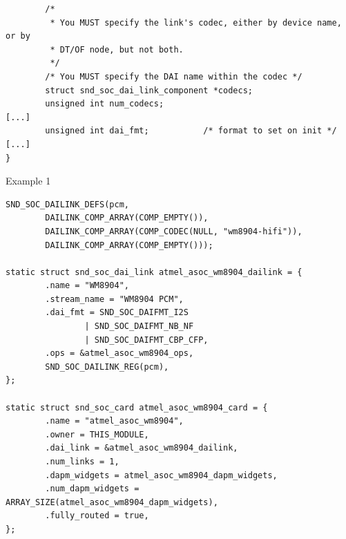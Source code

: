 \begin{frame}[fragile]{}
  \begin{block}{}
    \fontsize{10}{10}\selectfont
    \begin{verbatim}
        /*
         * You MUST specify the link's codec, either by device name, or by
         * DT/OF node, but not both.
         */
        /* You MUST specify the DAI name within the codec */
        struct snd_soc_dai_link_component *codecs;
        unsigned int num_codecs;
[...]
        unsigned int dai_fmt;           /* format to set on init */
[...]
}
    \end{verbatim}
  \end{block}
\end{frame}

\begin{frame}[fragile]{Example 1}
  \begin{block}{}
    \fontsize{8}{8}\selectfont
    \begin{verbatim}
SND_SOC_DAILINK_DEFS(pcm,
        DAILINK_COMP_ARRAY(COMP_EMPTY()),
        DAILINK_COMP_ARRAY(COMP_CODEC(NULL, "wm8904-hifi")),
        DAILINK_COMP_ARRAY(COMP_EMPTY()));

static struct snd_soc_dai_link atmel_asoc_wm8904_dailink = {
        .name = "WM8904",
        .stream_name = "WM8904 PCM",
        .dai_fmt = SND_SOC_DAIFMT_I2S
                | SND_SOC_DAIFMT_NB_NF
                | SND_SOC_DAIFMT_CBP_CFP,
        .ops = &atmel_asoc_wm8904_ops,
        SND_SOC_DAILINK_REG(pcm),
};

static struct snd_soc_card atmel_asoc_wm8904_card = {
        .name = "atmel_asoc_wm8904",
        .owner = THIS_MODULE,
        .dai_link = &atmel_asoc_wm8904_dailink,
        .num_links = 1,
        .dapm_widgets = atmel_asoc_wm8904_dapm_widgets,
        .num_dapm_widgets = ARRAY_SIZE(atmel_asoc_wm8904_dapm_widgets),
        .fully_routed = true,
};
    \end{verbatim}
  \end{block}
\end{frame}

